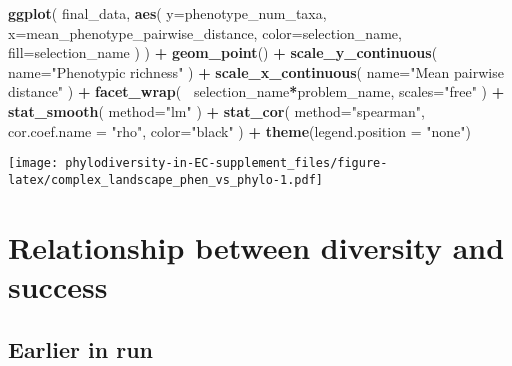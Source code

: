 \documentclass[]{book}
\newenvironment{Shaded}{\begin{snugshade}}{\end{snugshade}}
\newcommand{\DataTypeTok}[1]{\textcolor[rgb]{0.13,0.29,0.53}{#1}}
\newcommand{\KeywordTok}[1]{\textcolor[rgb]{0.13,0.29,0.53}{\textbf{#1}}}
\newcommand{\NormalTok}[1]{#1}
\newcommand{\OperatorTok}[1]{\textcolor[rgb]{0.81,0.36,0.00}{\textbf{#1}}}
\newcommand{\StringTok}[1]{\textcolor[rgb]{0.31,0.60,0.02}{#1}}
\begin{document}
\begin{Shaded}
\begin{Highlighting}[]
\KeywordTok{ggplot}\NormalTok{(}
\NormalTok{    final_data,}
    \KeywordTok{aes}\NormalTok{(}
        \DataTypeTok{y=}\NormalTok{phenotype_num_taxa,}
        \DataTypeTok{x=}\NormalTok{mean_phenotype_pairwise_distance,}
        \DataTypeTok{color=}\NormalTok{selection_name,}
        \DataTypeTok{fill=}\NormalTok{selection_name}
\NormalTok{    )}
\NormalTok{  ) }\OperatorTok{+}
\StringTok{  }\KeywordTok{geom_point}\NormalTok{() }\OperatorTok{+}
\StringTok{    }\KeywordTok{scale_y_continuous}\NormalTok{(}
        \DataTypeTok{name=}\StringTok{"Phenotypic richness"}
\NormalTok{  ) }\OperatorTok{+}
\StringTok{  }\KeywordTok{scale_x_continuous}\NormalTok{(}
        \DataTypeTok{name=}\StringTok{"Mean pairwise distance"}
\NormalTok{  ) }\OperatorTok{+}\StringTok{ }
\StringTok{  }\KeywordTok{facet_wrap}\NormalTok{(}
      \OperatorTok{~}\NormalTok{selection_name}\OperatorTok{*}\NormalTok{problem_name, }\DataTypeTok{scales=}\StringTok{"free"}
\NormalTok{  ) }\OperatorTok{+}\StringTok{ }
\StringTok{  }\KeywordTok{stat_smooth}\NormalTok{(}
    \DataTypeTok{method=}\StringTok{"lm"}
\NormalTok{  ) }\OperatorTok{+}\StringTok{ }
\StringTok{  }\KeywordTok{stat_cor}\NormalTok{(}
    \DataTypeTok{method=}\StringTok{"spearman"}\NormalTok{, }\DataTypeTok{cor.coef.name =} \StringTok{"rho"}\NormalTok{, }\DataTypeTok{color=}\StringTok{"black"}
\NormalTok{  ) }\OperatorTok{+}
\StringTok{  }\KeywordTok{theme}\NormalTok{(}\DataTypeTok{legend.position =} \StringTok{"none"}\NormalTok{)}
\end{Highlighting}
\end{Shaded}

\texttt{[image: phylodiversity-in-EC-supplement\_files/figure-latex/complex\_landscape\_phen\_vs\_phylo-1.pdf]}

\hypertarget{relationship-between-diversity-and-success-1}{%
\section{Relationship between diversity and success}\label{relationship-between-diversity-and-success-1}}

\hypertarget{earlier-in-run-1}{%
\subsection{Earlier in run}\label{earlier-in-run-1}}
\end{document}

